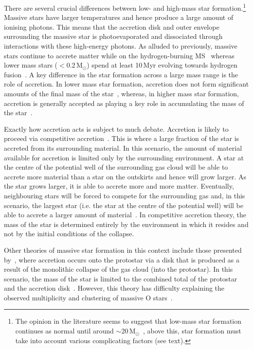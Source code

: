 There are several crucial differences between low- and high-mass star formation.\footnote{The opinion in the literature seems to suggest that low-mass star formation continues as normal until around $\sim$20\,M$_{\odot}$~\citep{Zinnecker07, Crowther12}, above this, star formation must take into account various complicating factors (see text).}
Massive stars have larger temperatures and hence produce a large amount of ionising photons.
This means that the accretion disk and outer envelope surrounding the massive star is photoevaporated and dissociated through interactions with these high-energy photons.
As alluded to previously, massive stars continue to accrete matter while on the hydrogen-burning MS~\citep{Zinnecker07}
whereas lower mass stars ($<$0.2\,M$_{\odot}$) spend at least 10\,Myr evolving towards hydrogen fusion~\citep{Luhman12}.
A key difference in the star formation across a large mass range is the role of accretion.
In lower mass star formation, accretion does not form significant amounts of the final mass of the star~\citep{Bonnell08}, whereas, in higher mass star formation, accretion is generally accepted as playing a key role in accumulating the mass of the star~\citep{Kraus10}.


Exactly how accretion acts is subject to much debate.
Accretion is likely to proceed via competitive accretion~\citep{Bonnell01}.
This is where a large fraction of the star is accreted from its surrounding material.
In this scenario, the amount of material available for accretion is limited only by the surrounding environment.
A star at the centre of the potential well of the surrounding gas cloud will be able to accrete more material than a star on the outskirts and hence will grow larger.
As the star grows larger, it is able to accrete more and more matter.
Eventually, neighbouring stars will be forced to compete for the surrounding gas and, in this scenario, the largest star (i.e. the star at the centre of the potential well) will be able to accrete a larger amount of material~\citep[for a useful economical analogy -- the rich get richer -- see Section 4.2 of][]{Zinnecker07}.
In competitive accretion theory, the mass of the star is determined entirely by the environment in which it resides and not by the initial conditions of the collapse.

Other theories of massive star formation in this context include those presented by~\cite{Yorke02}, where accretion occurs onto the protostar via a disk that is produced as a result of the monolithic collapse of the gas cloud (into the protostar).
In this scenario, the mass of the star is limited to the combined total of the protostar and the accretion disk~\citep{Zinnecker07}.
However, this theory has difficulty explaining the observed multiplicity and clustering of massive O stars~\citep{Zinnecker07,2012ARA&A..50..531K,Sana12}.

